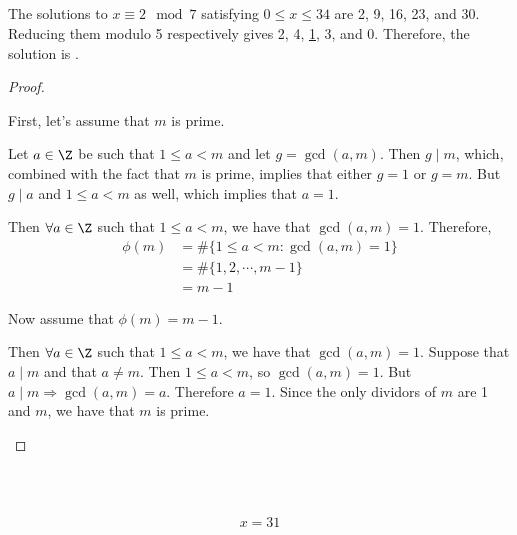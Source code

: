 \documentclass[
  coursecode={MTHE 418},
  assignmentname={Homework \homeworknumber},
  studentnumber=20053722,
  name={Bryan Hoang},
  draft,
  final,
]{
  ltxanswer%
}
\begin{document}
\begin{questions}
\begin{parts}
      \part{}
      \begin{solution}
        The solutions to \(x \equiv 2 \mod{7}\) satisfying \(0 \le x \le 34\) are 2, 9, 16, 23, and 30. Reducing them modulo 5 respectively gives 2, 4, \underline{1}, 3, and 0. Therefore, the solution is .
      \end{solution}
    \end{parts}

    \question{}
    \begin{solution}
      \begin{proof}
        \begin{proofpart} First, let's assume that \(m\) is prime.

          Let \(a \in \Z\) be such that \(1 \le a < m \) and let \(g = \gcd(a,m)\). Then \(g \mid m\), which, combined with the fact that \(m\) is prime, implies that either \(g = 1\) or \(g = m\). But \(g \mid a\) and \(1 \le a < m\) as well, which implies that \(a = 1\).

          Then \(\forall a \in \Z\) such that \(1 \le a < m\), we have that \(\gcd(a,m)=1\). Therefore,
          \begin{align*}
            \phi(m) &= \#\{1 \le a < m:\gcd(a,m)=1\} \\
                    &= \#\{1, 2, \cdots, m-1\}       \\
                    &= m-1
          \end{align*}
        \end{proofpart}
        \begin{proofpart}
          Now assume that \(\phi(m) = m-1\).

          Then \(\forall a \in \Z\) such that \(1 \le a < m\), we have that \(\gcd(a,m)=1\). Suppose that \(a \mid m\) and that \(a \ne m\). Then \(1 \le a < m\), so \(\gcd(a,m)=1\). But \(a \mid m \Rightarrow \gcd(a,m)=a\). Therefore \(a = 1\). Since the only dividors of \(m\) are 1 and \(m\), we have that \(m\) is prime.
        \end{proofpart}
      \end{proof}
    \end{solution}

    \question\
    \begin{parts}
      \part{}
      \begin{solution}
        \begin{equation*}
          \boxed{x = 31}
        \end{equation*}
      \end{solution}


\end{parts}
\end{questions}
\end{document}
